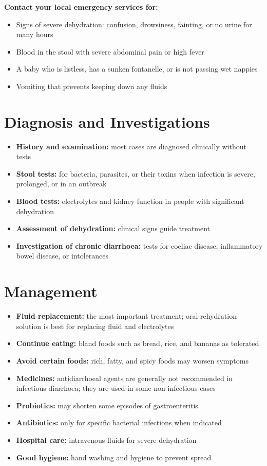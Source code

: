 \textbf{Contact your local emergency services for:}
\begin{itemize}
    \item Signs of severe dehydration: confusion, drowsiness, fainting, or no urine for many hours
    \item Blood in the stool with severe abdominal pain or high fever
    \item A baby who is listless, has a sunken fontanelle, or is not passing wet nappies
    \item Vomiting that prevents keeping down any fluids
\end{itemize}

\section*{Diagnosis and Investigations}
\begin{itemize}
    \item \textbf{History and examination:} most cases are diagnosed clinically without tests
    \item \textbf{Stool tests:} for bacteria, parasites, or their toxins when infection is severe, prolonged, or in an outbreak
    \item \textbf{Blood tests:} electrolytes and kidney function in people with significant dehydration
    \item \textbf{Assessment of dehydration:} clinical signs guide treatment
    \item \textbf{Investigation of chronic diarrhoea:} tests for coeliac disease, inflammatory bowel disease, or intolerances
\end{itemize}

\section*{Management}
\begin{itemize}
    \item \textbf{Fluid replacement:} the most important treatment; oral rehydration solution is best for replacing fluid and electrolytes
    \item \textbf{Continue eating:} bland foods such as bread, rice, and bananas as tolerated
    \item \textbf{Avoid certain foods:} rich, fatty, and spicy foods may worsen symptoms
    \item \textbf{Medicines:} antidiarrhoeal agents are generally not recommended in infectious diarrhoea; they are used in some non-infectious cases
    \item \textbf{Probiotics:} may shorten some episodes of gastroenteritis
    \item \textbf{Antibiotics:} only for specific bacterial infections when indicated
    \item \textbf{Hospital care:} intravenous fluids for severe dehydration
    \item \textbf{Good hygiene:} hand washing and hygiene to prevent spread
\end{itemize}

